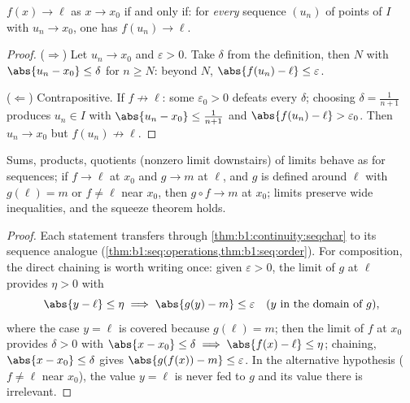 \begin{theorem}\label{thm:b1:continuity:seqchar}
$f(x) \to \ell$ as $x \to x_0$ if and only if: for \emph{every}
sequence $(u_n)$ of points of $I$ with $u_n \to x_0$, one has
$f(u_n) \to \ell$.
\end{theorem}

\begin{proof}
($\Rightarrow$) Let $u_n \to x_0$ and $\varepsilon > 0$. Take
$\delta$ from the definition, then $N$ with $\abs{u_n - x_0} \leq
\delta$ for $n \geq N$: beyond $N$, $\abs{f(u_n) - \ell} \leq
\varepsilon$.

($\Leftarrow$) Contrapositive. If $f \not\to \ell$: some
$\varepsilon_0 > 0$ defeats every $\delta$; choosing $\delta =
\frac{1}{n+1}$ produces $u_n \in I$ with $\abs{u_n - x_0} \leq
\frac{1}{n+1}$ and $\abs{f(u_n) - \ell} > \varepsilon_0$. Then $u_n
\to x_0$ but $f(u_n) \not\to \ell$.
\end{proof}

\begin{corollary}\label{cor:b1:continuity:operations}
Sums, products, quotients (nonzero limit downstairs) of limits behave
as for sequences; if $f \to \ell$ at $x_0$ and $g \to m$ at $\ell$,
and $g$ is defined around $\ell$ with $g(\ell) = m$ or $f \neq \ell$
near $x_0$, then $g \circ f \to m$ at $x_0$; limits preserve wide
inequalities, and the squeeze theorem holds.
\end{corollary}

\begin{proof}
Each statement transfers through
\cref{thm:b1:continuity:seqchar} to its sequence analogue
(\cref{thm:b1:seq:operations,thm:b1:seq:order}). For composition,
the direct chaining is worth writing once: given $\varepsilon >
0$, the limit of $g$ at $\ell$ provides $\eta > 0$ with
\[
\abs{y - \ell} \leq \eta \implies \abs{g(y) - m} \leq
\varepsilon \quad (y \text{ in the domain of } g),
\]
where the case $y = \ell$ is covered because $g(\ell) = m$; then
the limit of $f$ at $x_0$ provides $\delta > 0$ with $\abs{x -
x_0} \leq \delta \implies \abs{f(x) - \ell} \leq \eta$; chaining,
$\abs{x - x_0} \leq \delta$ gives $\abs{g(f(x)) - m} \leq
\varepsilon$. In the alternative hypothesis ($f \neq \ell$ near
$x_0$), the value $y = \ell$ is never fed to $g$ and its value
there is irrelevant.
\end{proof}

